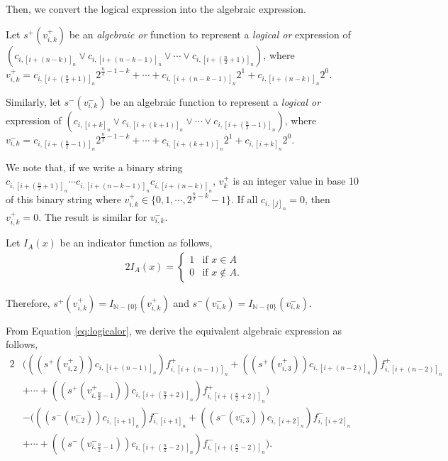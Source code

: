 Then, we convert the logical expression into the algebraic expression.

Let  $s^{+}(v_{i,k}^+)$ be an \textit{algebraic or} function to represent a \textit{logical or} expression of $(c_{i,[i+(n-k)]_n} \lor c_{i,[i+(n-k-1)]_n} \lor \cdots \lor c_{i,[i+(\frac{n}{2}+1)]_n})$, where $v_{i,k}^+ =  c_{i,[i+(\frac{n}{2}+1)]_n}2^{\frac{n}{2}-1-k} + \cdots + c_{i,[i+(n-k-1)]_n}2^{1} + c_{i,[i+(n-k)]_n}2^{0}$. 

Similarly, let $s^{-}(v_{i,k}^-)$ be an algebraic function to represent a \textit{logical or} expression of $(c_{i,[i+k]_n} \lor c_{i,[i+(k+1)]_n} \lor \cdots \lor c_{i,[i+(\frac{n}{2}-1)]_n})$, where $v_{i,k}^- = c_{i,[i+(\frac{n}{2}-1)]_n}2^{\frac{n}{2}-1-k} + \cdots + c_{i,[i+(k+1)]_n}2^{1} + c_{i,[i+k]_n}2^{0}$.

We note that, if we write a binary string $c_{i,[i+(\frac{n}{2}+1)]_n} \cdots c_{i,[i+(n-k-1)]_n}c_{i,[i+(n-k)]_n}$, $v_k^+$ is an integer value in base 10 of this binary string where $v_{i,k}^+ \in \lbrace 0,1,\cdots,2^{\frac{n}{2}-k}-1 \rbrace$. If all $c_{i,[j]_n} = 0$, then $v_{i,k}^+ = 0$. The result is similar for $v_{i,k}^-$.

Let $I_A(x)$ be an indicator function as follows,
\begin{alignat}{2}
I_A(x) = \begin{cases}1 & \text{if }x \in A \\ 0 & \text{if }x \notin A. \end{cases}
\label{eq:indicator}
\end{alignat}

Therefore, $s^+(v_{i,k}^+) = I_{ \mathbb{N} - \lbrace 0 \rbrace}(v_{i,k}^+)$ and $s^-(v_{i,k}^-) = I_{ \mathbb{N} - \lbrace 0 \rbrace}(v_{i,k}^-)$. %

From Equation \ref{eq:logicalor}, we derive the equivalent algebraic expression as follows,
\begin{alignat}{2}
&\Bigg(((s^+(v_{i,2}^+))c_{i,[i+(n-1)]_n}) f_{i,[i+(n-1)]_n}^{+} + ((s^+(v_{i,3}^+))c_{i,[i+(n-2)]_n}) f_{i,[i+(n-2)]_n}^{+} \nonumber \\
  &+ \cdots + ((s^+(v_{i,\frac{n}{2} - 1}^+))c_{i,[i+(\frac{n}{2}+2)]_n})f_{i,[i+(\frac{n}{2}+2)]_n}^{+}\Bigg) \nonumber \\
&-\Bigg(((s^-(v_{i,2}^-))c_{i,[i+1]_n})  f_{i,[i+1]_n}^{-} + ((s^-(v_{i,3}^-))c_{i,[i+2]_n})  f_{i,[i+2]_n}^{-} \nonumber \\
  &+ \cdots + ((s^-(v_{i,\frac{n}{2} - 1}^-))c_{i,[i+(\frac{n}{2}-2)]_n})f_{i,[i+(\frac{n}{2}-2)]_n}^{-}\Bigg).
\end{alignat}

